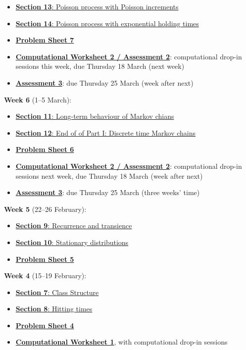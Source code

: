 \documentclass[
  a4paper,
]{article}
\providecommand{\tightlist}{%
  \setlength{\itemsep}{0pt}\setlength{\parskip}{0pt}}
\theoremstyle{definition}
\theoremstyle{definition}
\theoremstyle{definition}
\theoremstyle{remark}
\begin{document}
\begin{itemize}
\tightlist
\item
  \protect\hyperlink{S13-poisson-poisson}{\textbf{Section 13}: Poisson process with Poisson increments}
\item
  \protect\hyperlink{S14-poisson-exponential}{\textbf{Section 14}: Poisson process with exponential holding times}
\item
  \protect\hyperlink{P07}{\textbf{Problem Sheet 7}}
\item
  \protect\hyperlink{computing}{\textbf{Computational Worksheet 2 / Assessment 2}}: computational drop-in sessions this week, due Thursday 18 March (next week)
\item
  \protect\hyperlink{A3}{\textbf{Assessment 3}}: due Thursday 25 March (week after next)
\end{itemize}

\textbf{Week 6} (1--5 March):

\begin{itemize}
\tightlist
\item
  \protect\hyperlink{S11-long-term-chains}{\textbf{Section 11}: Long-term behaviour of Markov chians}
\item
  \protect\hyperlink{S12-revision-i}{\textbf{Section 12}: End of of Part I: Discrete time Markov chains}
\item
  \protect\hyperlink{P06}{\textbf{Problem Sheet 6}}
\item
  \protect\hyperlink{computing}{\textbf{Computational Worksheet 2 / Assessment 2}}: computational drop-in sessions next week, due Thursday 18 March (week after next)
\item
  \protect\hyperlink{A3}{\textbf{Assessment 3}}: due Thursday 25 March (three weeks' time)
\end{itemize}

\textbf{Week 5} (22--26 February):

\begin{itemize}
\tightlist
\item
  \protect\hyperlink{S09-recurrence-transience}{\textbf{Section 9}: Recurrence and transience}
\item
  \protect\hyperlink{S10-stationary-distributions}{\textbf{Section 10}: Stationary distributions}
\item
  \protect\hyperlink{P05}{\textbf{Problem Sheet 5}}
\end{itemize}

\textbf{Week 4} (15--19 February):

\begin{itemize}
\tightlist
\item
  \protect\hyperlink{S07-classes}{\textbf{Section 7}: Class Structure}
\item
  \protect\hyperlink{S08-hitting-times}{\textbf{Section 8}: Hitting times}
\item
  \protect\hyperlink{P04}{\textbf{Problem Sheet 4}}
\item
  \protect\hyperlink{computing}{\textbf{Computational Worksheet 1}}, with computational drop-in sessions
\end{itemize}
\end{document}

